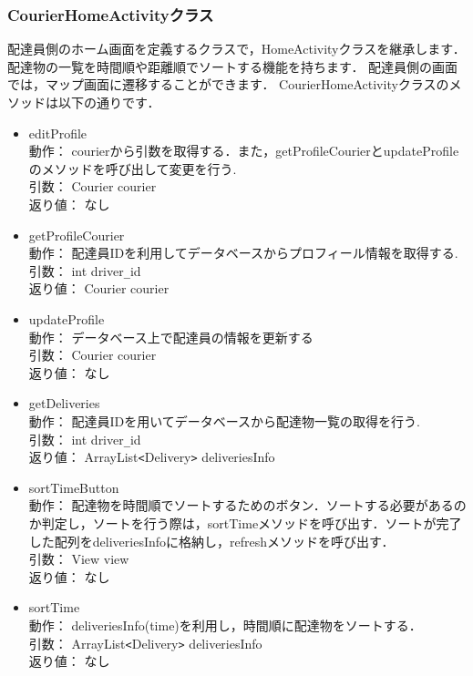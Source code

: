 \documentclass[a4j,titlepage]{jarticle}
\begin{document}
\subsubsection{CourierHomeActivityクラス}
配達員側のホーム画面を定義するクラスで，HomeActivityクラスを継承します．
配達物の一覧を時間順や距離順でソートする機能を持ちます．
配達員側の画面では，マップ画面に遷移することができます．
CourierHomeActivityクラスのメソッドは以下の通りです．
\begin{itemize}
\item editProfile\\
動作： courierから引数を取得する．また，getProfileCourierとupdateProfileのメソッドを呼び出して変更を行う.\\
引数： Courier courier\\
返り値： なし

\item getProfileCourier\\
動作： 配達員IDを利用してデータベースからプロフィール情報を取得する.\\
引数： int driver\verb|_|id\\
返り値： Courier courier

\item updateProfile\\
動作： データベース上で配達員の情報を更新する\\
引数： Courier courier\\
返り値： なし

\item getDeliveries\\
動作： 配達員IDを用いてデータベースから配達物一覧の取得を行う.\\
引数： int driver\verb|_|id\\
返り値： ArrayList\verb|<|Delivery\verb|>| deliveriesInfo

\item sortTimeButton\\
動作： 配達物を時間順でソートするためのボタン．ソートする必要があるのか判定し，ソートを行う際は，sortTimeメソッドを呼び出す．ソートが完了した配列をdeliveriesInfoに格納し，refreshメソッドを呼び出す．\\
引数： View view\\
返り値： なし

\item sortTime\\
動作： deliveriesInfo(time)を利用し，時間順に配達物をソートする．\\
引数： ArrayList\verb|<|Delivery\verb|>| deliveriesInfo\\
返り値： なし


\end{itemize}
\end{document}
